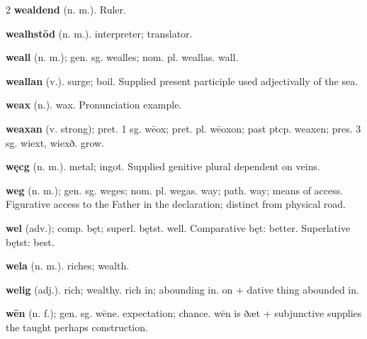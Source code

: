 \begin{multicols*}{2}
\textbf{wealdend} (n. m.). Ruler.\par
\textbf{wealhstōd} (n. m.). interpreter; translator.\par
\textbf{weall} (n. m.); gen. sg. wealles; nom. pl. weallas. wall.\par
\textbf{weallan} (v.). surge; boil. Supplied present participle used adjectivally of the sea.\par
\textbf{weax} (n.). wax. Pronunciation example.\par
\textbf{weaxan} (v. strong); pret. 1 sg. wēox; pret. pl. wēoxon; past ptcp. weaxen; pres. 3 sg. wiext, wiexð. grow.\par
\textbf{węcg} (n. m.). metal; ingot. Supplied genitive plural dependent on veins.\par
\textbf{weg} (n. m.); gen. sg. weges; nom. pl. wegas. way; path. way; means of access. Figurative access to the Father in the declaration; distinct from physical road.\par
\textbf{wel} (adv.); comp. bęt; superl. bętst. well. Comparative bęt: better. Superlative bętst: best.\par
\textbf{wela} (n. m.). riches; wealth.\par
\textbf{welig} (adj.). rich; wealthy. rich in; abounding in. on + dative thing abounded in.\par
\textbf{wēn} (n. f.); gen. sg. wēne. expectation; chance. wēn is ðæt + subjunctive supplies the taught perhaps construction.\par

\end{multicols*}
